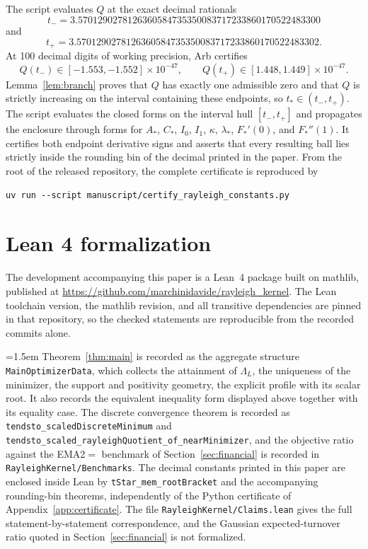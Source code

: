 \documentclass[11pt]{amsart}
\theoremstyle{definition}
\theoremstyle{remark}
\begin{document}
The script evaluates $Q$ at the exact decimal rationals
\[
 t_-=3.5701290278126360584735350083717233860170522483300
\]
and
\[
 t_+=3.5701290278126360584735350083717233860170522483302.
\]
At 100 decimal digits of working precision, Arb certifies
\[
 Q(t_-)\in[-1.553,-1.552]\times10^{-47},
 \qquad
 Q(t_+)\in[1.448,1.449]\times10^{-47}.
\]
Lemma~\ref{lem:branch} proves that $Q$ has exactly one admissible zero and that
$Q$ is strictly increasing on the interval containing these endpoints, so
$t_*\in(t_-,t_+)$. The script evaluates the closed forms on the interval hull
$[t_-,t_+]$ and propagates the enclosure through
forms for $A_*$, $C_*$, $I_0$, $I_1$, $\kappa$, $\lambda_*$,
$F_*'(0)$, and $F_*''(1)$. It certifies both endpoint derivative signs and
asserts that every resulting ball lies strictly inside the rounding bin of the
decimal printed in the paper. From the root of the released repository, the complete
certificate is reproduced by
{\small\ttfamily
\begin{verbatim}
uv run --script manuscript/certify_rayleigh_constants.py
\end{verbatim}}

\section{Lean 4 formalization}\label{app:lean}
The development accompanying this paper is a Lean~4 package built on mathlib,
published at
\url{https://github.com/marchinidavide/rayleigh_kernel}. The Lean toolchain
version, the mathlib revision, and all transitive dependencies are pinned in
that repository, so the checked statements are reproducible from the recorded
commits alone.

\begingroup\emergencystretch=1.5em
Theorem~\ref{thm:main} is recorded as the aggregate structure
\texttt{MainOptimizerData}, which collects the attainment of $\Lambda_L$, the
uniqueness of the minimizer, the support and positivity geometry, the explicit
profile with its scalar root. It also records the equivalent inequality form
displayed above together with its equality case. The discrete convergence theorem is recorded as
\newline\texttt{tendsto\_scaledDiscreteMinimum} and
\newline\texttt{tendsto\_scaled\_rayleighQuotient\_of\_nearMinimizer}, and the
objective ratio against the EMA2$=$ benchmark of Section~\ref{sec:financial} is recorded in \newline\texttt{RayleighKernel/Benchmarks}. The decimal constants printed in this paper are enclosed inside Lean by \texttt{tStar\_mem\_rootBracket} and the accompanying rounding-bin theorems, independently of the Python certificate of Appendix~\ref{app:certificate}. The file \texttt{RayleighKernel/Claims.lean} gives the full statement-by-statement
correspondence, and the Gaussian expected-turnover ratio quoted in
Section~\ref{sec:financial} is not formalized.
\par\endgroup
\end{document}

